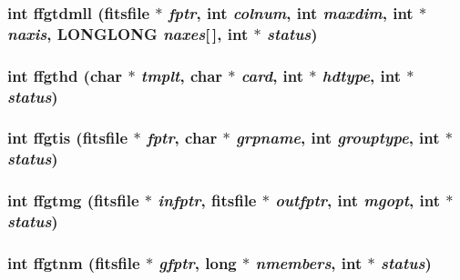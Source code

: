 \subsubsection{\setlength{\rightskip}{0pt plus 5cm}int ffgtdmll (\bf{fitsfile} $\ast$ {\em fptr}, int {\em colnum}, int {\em maxdim}, int $\ast$ {\em naxis}, \bf{LONGLONG} {\em naxes}[$\,$], int $\ast$ {\em status})}\label{src_2fitsio_8h_37098ac493b769dba1d2055cbc7d3c28}


\subsubsection{\setlength{\rightskip}{0pt plus 5cm}int ffgthd (char $\ast$ {\em tmplt}, char $\ast$ {\em card}, int $\ast$ {\em hdtype}, int $\ast$ {\em status})}\label{src_2fitsio_8h_d6a4e75b3a5f5458a4879db512e5dc79}


\subsubsection{\setlength{\rightskip}{0pt plus 5cm}int ffgtis (\bf{fitsfile} $\ast$ {\em fptr}, char $\ast$ {\em grpname}, int {\em grouptype}, int $\ast$ {\em status})}\label{src_2fitsio_8h_ad66e057c6116029d10db0638ff52a79}


\subsubsection{\setlength{\rightskip}{0pt plus 5cm}int ffgtmg (\bf{fitsfile} $\ast$ {\em infptr}, \bf{fitsfile} $\ast$ {\em outfptr}, int {\em mgopt}, int $\ast$ {\em status})}\label{src_2fitsio_8h_aada40a732e548823c7f5a64114de6b7}


\subsubsection{\setlength{\rightskip}{0pt plus 5cm}int ffgtnm (\bf{fitsfile} $\ast$ {\em gfptr}, long $\ast$ {\em nmembers}, int $\ast$ {\em status})}\label{src_2fitsio_8h_b80f93976748e97b100bb159c245ed96}


